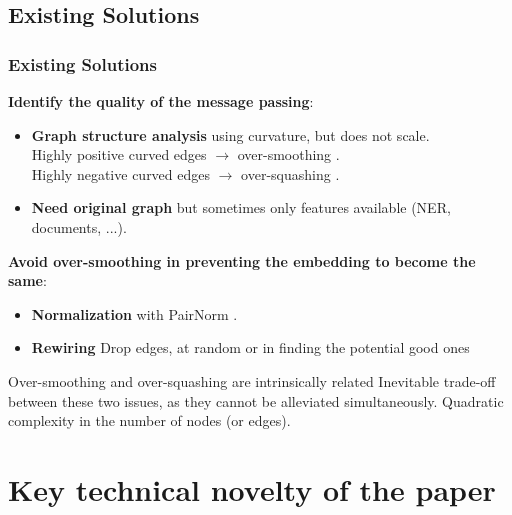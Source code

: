 \documentclass[10pt, aspectratio = 169]{beamer}
\begin{document}
\subsection{Existing Solutions}
\begin{frame}
    \frametitle{Existing Solutions}
    \textbf{Identify the quality of the message passing}:
    \begin{itemize}
        \item \textbf{Graph structure analysis} using curvature, but does not scale.
        \\Highly positive curved edges $\rightarrow$ over-smoothing \cite[Nguyen et al., 2023]{nguyen2023revisiting}.
        \\Highly negative curved edges $\rightarrow$ over-squashing \cite[Topping et al., 2021]{topping2022understandingoversquashingbottlenecksgraphs}.
        \item \textbf{Need original graph} but sometimes only features available (NER, documents, ...).
    \end{itemize}

    \textbf{Avoid over-smoothing in preventing the embedding to become the same}:
    \begin{itemize}
        \item \textbf{Normalization} with PairNorm \cite[Zaho, 2020]{zhao2020pairnorm}.
        \item \textbf{Rewiring} Drop edges, at random \cite[Rong, 2019]{rong2019dropedge} 
              or in finding the potential good ones \cite[Giraldo, 2023]{Giraldo_2023}
    \end{itemize}

    \begin{alertblock}{Over-smoothing and over-squashing are intrinsically related}
        Inevitable trade-off between these two issues, as they cannot be alleviated simultaneously.
        Quadratic complexity in the number of nodes (or edges).
    \end{alertblock}

\end{frame}

\section{Key technical novelty of the paper}
\end{document}
